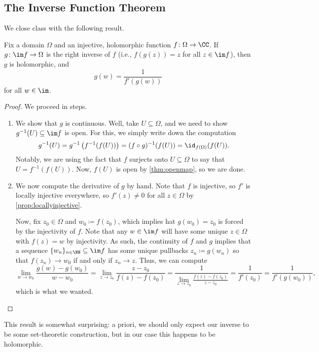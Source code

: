 \documentclass[../notes.tex]{subfiles}
\begin{document}
\subsection{The Inverse Function Theorem}
We close class with the following result.
\begin{theorem} \label{thm:inv}
	Fix a domain $\Omega$ and an injective, holomorphic function $f\colon \Omega\to\CC$. If $g\colon \im f\to\Omega$ is the right inverse of $f$ (i.e., $f(g(z))=z$ for all $z\in\im f$), then $g$ is holomorphic, and
	\[g(w)=\frac1{f'(g(w))}\]
	for all $w\in\im $.
\end{theorem}
\begin{proof}
	We proceed in steps.
	\begin{enumerate}
		\item We show that $g$ is continuous. Well, take $U\subseteq\Omega$, and we need to show $g^{-1}(U)\subseteq\im f$ is open. For this, we simply write down the computation
		\[g^{-1}(U)=g^{-1}\left(f^{-1}(f(U))\right)=(f\circ g)^{-1}(f(U))=\id_{f(\Omega)}(f(U)).\]
		Notably, we are using the fact that $f$ surjects onto $U\subseteq\Omega$ to say that $U=f^{-1}(f(U))$. Now, $f(U)$ is open by \autoref{thm:openmap}, so we are done.
		\item We now compute the derivative of $g$ by hand. Note that $f$ is injective, so $f'$ is locally injective everywhere, so $f'(z)\ne0$ for all $z\in\Omega$ by \autoref{prop:locallyinjective}.
		
		Now, fix $z_0\in\Omega$ and $w_0\coloneqq f(z_0)$, which implies hat $g(w_0)=z_0$ is forced by the injectivity of $f$. Note that any $w\in\im f$ will have some unique $z\in\Omega$ with $f(z)=w$ by injectivity. As such, the continuity of $f$ and $g$ implies that a sequence $\{w_n\}_{n\in\NN}\subseteq\im f$ has some unique pullbacks $z_n\coloneqq g(w_n)$ so that $f(z_n)\to w_0$ if and only if $z_n\to z$. Thus, we can compute
		\[\lim_{w\to w_0}\frac{g(w)-g(w_0)}{w-w_0}=\lim_{z\to z_0}\frac{z-z_0}{f(z)-f(z_0)}=\frac1{\lim_{z\to z_0}\frac{f(z)-f(z_0)}{z-z_0}}=\frac1{f'(z_0)}=\frac1{f'(g(w_0))},\]
		which is what we wanted.
		\qedhere
	\end{enumerate}
\end{proof}
\begin{remark}
	This result is somewhat surprising: a priori, we should only expect our inverse to be some set-theoretic construction, but in our case this happens to be holomorphic.
\end{remark}
\end{document}
